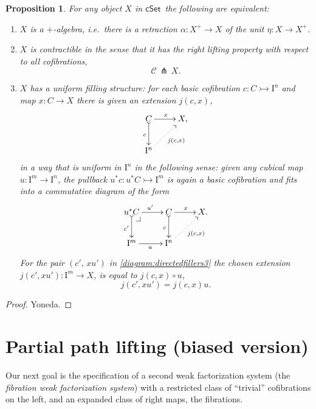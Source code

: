 \documentclass[11pt]{article}
\makeatletter
\newcommand{\cSet}{\ensuremath{\mathsf{cSet}}}
\newcommand{\pbcorner}[1][dr]{\save*!/#1-1.2pc/#1:(-1,1)@^{|-}\restore}
\newcommand{\mono}{\ensuremath{\rightarrowtail}}
\newcommand{\I}{\ensuremath{\mathrm{I}}}
\newtheorem{proposition}[theorem]{Proposition}
\theoremstyle{remark}
\theoremstyle{definition}
\makeatother
\begin{document}
\begin{proposition}\label{prop:uniformstructequiv} For any object $X$ in \cSet\ the following are equivalent:
\begin{enumerate}
\item $X$ is a \emph{$+$-algebra}, i.e.\ there is a retraction $\alpha :X^+ \to X$ of the unit $\eta : X\to X^+$.
\item $X$ is  \emph{contractible} in the sense that it has the right lifting property with respect to all cofibrations,
\[
\mathcal{C}\, \pitchfork\,X.
\]
\item $X$ has a \emph{uniform filling structure}: 
for each basic cofibration $c : C \mono \I^{n}$ and map $x : C\to X$ there is given an extension $j(c,x)$,
\begin{equation}\label{diagram:directedfillers}
\xymatrix{
C \ar@{>->}[d]_{c} \ar[r]^{x} & X, \\
\I^{n}\ar@{.>}[ru]_{j(c,x)} &
}
\end{equation}
in a way that is \emph{uniform in $\I^n$} in the following sense: given any cubical map $u : \I^m \to \I^n$, the pullback $u^*c : u^*C\mono \I^m$ is again a basic cofibration and fits into a commutative diagram of the form
\begin{equation}\label{diagram:directedfillers3}
\xymatrix{
u^*C \ar@{>->}[d]_{c'} \ar[r]^{u'} \pbcorner &  C \ar@{>->}[d]_{c} \ar[r]^{x} & X. \\
\I^{m} \ar[r]_{u} & \I^{n} \ar@{.>}[ru]_{j(c,x)} &
}
\end{equation}
For the pair $(c',\, xu')$ in \eqref{diagram:directedfillers3} the chosen extension $j(c',xu'): \I^m \to X$, is equal to  $j(c,x)\circ u$,
\begin{equation}\label{eq:uniformfillers}
j(c',xu') = j(c,x) u.
\end{equation}
\end{enumerate}
\end{proposition}

\begin{proof}
Yoneda.
\end{proof}

\section{Partial path lifting (biased version)}

Our next goal is the specification of a second weak factorization system (the \emph{fibration weak factorization system}) with a restricted class of ``trivial'' cofibrations on the left, and an expanded class of right maps, the fibrations. 
\end{document}
